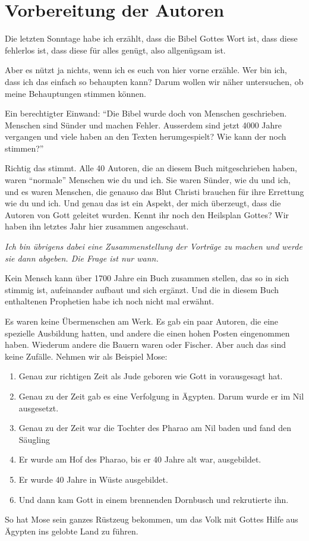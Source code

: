 \section{Vorbereitung der Autoren}
Die letzten Sonntage habe ich erzählt, dass die Bibel Gottes Wort ist, dass diese fehlerlos ist, dass diese für alles genügt, also allgenügsam ist.

Aber es nützt ja nichts, wenn ich es euch von hier vorne erzähle. Wer bin ich, dass ich das einfach so behaupten kann? Darum wollen wir näher untersuchen, ob meine Behauptungen stimmen können.

Ein berechtigter Einwand: \enquote{Die Bibel wurde doch von Menschen geschrieben. Menschen sind Sünder und machen Fehler. Ausserdem sind jetzt 4000 Jahre vergangen und viele haben an den Texten herumgespielt? Wie kann der noch stimmen?}

Richtig das stimmt. Alle 40 Autoren, die an diesem Buch mitgeschrieben haben, waren \enquote{normale} Menschen wie du und ich. Sie waren Sünder, wie du und ich, und es waren Menschen, die genauso das Blut Christi brauchen für ihre Errettung wie du und ich. Und genau das ist ein Aspekt, der mich überzeugt, dass die Autoren von Gott geleitet wurden. Kennt ihr noch den Heilsplan Gottes? Wir haben ihn letztes Jahr hier zusammen angeschaut. 

\textit{Ich bin übrigens dabei eine Zusammenstellung der Vorträge zu machen und werde sie dann abgeben. Die Frage ist nur wann. } 

Kein Mensch kann über 1700 Jahre ein Buch zusammen stellen, das so in sich  stimmig ist, aufeinander aufbaut und sich ergänzt. Und die in diesem Buch enthaltenen Prophetien habe ich noch nicht mal erwähnt. 

Es waren keine Übermenschen am Werk. Es gab ein paar Autoren, die eine spezielle Ausbildung hatten, und andere die einen hohen Posten eingenommen haben. Wiederum andere die Bauern waren oder Fischer. Aber auch das sind keine Zufälle. Nehmen wir als Beispiel Mose:
\begin{enumerate}
    \item Genau zur richtigen Zeit als Jude geboren wie Gott in  vorausgesagt hat.
    \item Genau zu der Zeit gab es eine Verfolgung in Ägypten. Darum wurde er im Nil ausgesetzt.
    \item Genau zu der Zeit war die Tochter des Pharao am Nil baden und fand den Säugling
    \item Er wurde am Hof des Pharao, bis er 40 Jahre alt war, ausgebildet.
    \item Er wurde 40 Jahre in Wüste ausgebildet. 
    \item Und dann kam Gott in einem brennenden Dornbusch und rekrutierte ihn.
\end{enumerate}
So hat Mose sein ganzes Rüstzeug bekommen, um das Volk mit Gottes Hilfe aus Ägypten ins gelobte Land zu führen.

